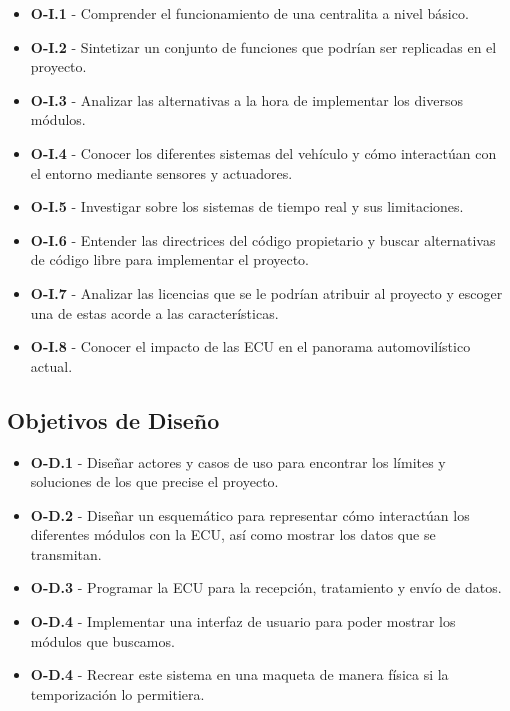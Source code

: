 \begin{itemize}
    \item \textbf{O-I.1} - Comprender el funcionamiento de una centralita a nivel básico.
    \item \textbf{O-I.2} - Sintetizar un conjunto de funciones que podrían ser replicadas en el proyecto.
    \item \textbf{O-I.3} - Analizar las alternativas a la hora de implementar los diversos módulos.
    \item \textbf{O-I.4} - Conocer los diferentes sistemas del vehículo y cómo interactúan con el entorno mediante sensores y actuadores.
    \item \textbf{O-I.5} - Investigar sobre los sistemas de tiempo real y sus limitaciones.
    \item \textbf{O-I.6} - Entender las directrices del código propietario y buscar alternativas de código libre para implementar el proyecto.
    \item \textbf{O-I.7} - Analizar las licencias que se le podrían atribuir al proyecto y escoger una de estas acorde a las características.
    \item \textbf{O-I.8} - Conocer el impacto de las ECU en el panorama automovilístico actual. 
\end{itemize}

\subsection{Objetivos de Diseño}
\begin{itemize}
    \item \textbf{O-D.1} - Diseñar actores y casos de uso para encontrar los límites y soluciones de los que precise el proyecto.
    \item \textbf{O-D.2} - Diseñar un esquemático para representar cómo interactúan los diferentes módulos con la ECU, así como mostrar los datos que se transmitan.
    \item \textbf{O-D.3} - Programar la ECU para la recepción, tratamiento y envío de datos.
    \item \textbf{O-D.4} - Implementar una interfaz de usuario para poder mostrar los módulos que buscamos.
    \item \textbf{O-D.4} - Recrear este sistema en una maqueta de manera física si la temporización lo permitiera.
\end{itemize}
